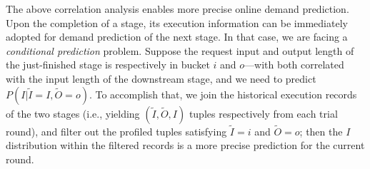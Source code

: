 The above correlation analysis enables more precise online demand prediction.
Upon the completion of a stage, its execution information can be immediately adopted for demand prediction of the next stage. 
In that case, we are facing a \emph{conditional prediction} problem.
Suppose the request input and output length of the just-finished stage is respectively in bucket $i$ and $o$---with both correlated with the input length of the downstream stage, and we need to predict $P(I|\tilde{I}=I, \tilde{O}=o)$. 
To accomplish that, we join the historical execution records of the two stages (i.e., yielding $(\tilde{I}, \tilde{O}, I)$ tuples respectively from each trial round), and filter out the profiled tuples satisfying $\tilde{I}=i$ and $\tilde{O}=o$; then the $I$ distribution within the filtered records is a more precise prediction for the current round.




